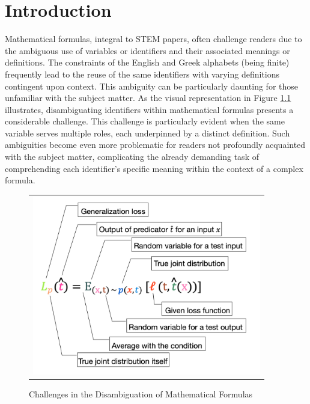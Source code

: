 \chapter{Introduction}\label{chapter:introduction}

Mathematical formulas, integral to \ac{STEM} papers, often challenge readers due to the ambiguous use of variables or identifiers and their associated meanings or definitions. The constraints of the English and Greek alphabets (being finite) frequently lead to the reuse of the same identifiers with varying definitions contingent upon context. This ambiguity can be particularly daunting for those unfamiliar with the subject matter. As the visual representation in Figure \ref{fig:introduction-motivation} illustrates, disambiguating identifiers within mathematical formulas presents a considerable challenge. This challenge is particularly evident when the same variable serves multiple roles, each underpinned by a distinct definition. Such ambiguities become even more problematic for readers not profoundly acquainted with the subject matter, complicating the already demanding task of comprehending each identifier's specific meaning within the context of a complex formula.

\begin{figure}[htpb]
  \centering
  \begin{tabular}{c}
    \includegraphics[width=10cm]{images/introduction-motivation.png}
  \end{tabular}
  \caption[Challenges in Disambiguation]{Challenges in the Disambiguation of Mathematical Formulas}\label{fig:introduction-motivation}
\end{figure}


